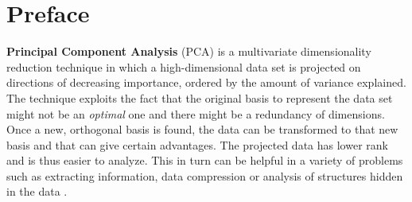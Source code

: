 \documentclass[10pt,twocolumn]{article}
\begin{document}



\vspace{10mm}

\setlength{\parindent}{0cm}

\fontsize{14}{10}\selectfont {Kamila Zdybał}

\vspace{2mm}

\fontsize{8}{10}

\fontsize{8}{10}

\section*{Preface}

\textbf{Principal Component Analysis} (PCA) is a multivariate dimensionality reduction technique in which a high-dimensional data set is projected on directions of decreasing importance, ordered by the amount of variance explained. The technique exploits the fact that the original basis to represent the data set might not be an \textit{optimal} one and there might be a redundancy of dimensions. Once a new, orthogonal basis is found, the data can be transformed to that new basis and that can give certain advantages. The projected data has lower rank and is thus easier to analyze. This in turn can be helpful in a variety of problems such as extracting information, data compression or analysis of structures hidden in the data \cite{Abdi_Williams}.
\end{document}
